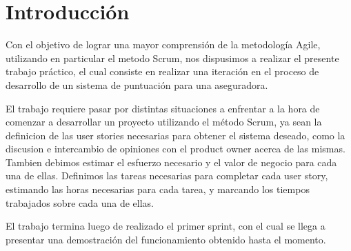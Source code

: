 \section{Introducción}

Con el objetivo de lograr una mayor comprensión de la metodología Agile, utilizando en particular el metodo Scrum, nos dispusimos a realizar el presente trabajo práctico, el cual consiste en realizar una iteración en el proceso de desarrollo de un sistema de puntuación para una aseguradora.

El trabajo requiere pasar por distintas situaciones a enfrentar a la hora de comenzar a desarrollar un proyecto utilizando el método Scrum, ya sean la definicion de las user stories necesarias para obtener el sistema deseado, como la discusion e intercambio de opiniones con el product owner acerca de las mismas. Tambien debimos estimar el esfuerzo necesario y el valor de negocio para cada una de ellas. Definimos las tareas necesarias para completar cada user story, estimando las horas necesarias para cada tarea, y marcando los tiempos trabajados sobre cada una de ellas.

El trabajo termina luego de realizado el primer sprint, con el cual se llega a presentar una demostración del funcionamiento obtenido hasta el momento.